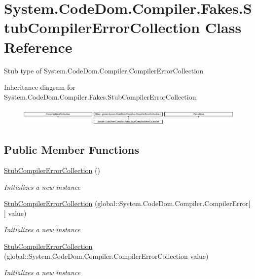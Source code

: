 \hypertarget{class_system_1_1_code_dom_1_1_compiler_1_1_fakes_1_1_stub_compiler_error_collection}{\section{System.\-Code\-Dom.\-Compiler.\-Fakes.\-Stub\-Compiler\-Error\-Collection Class Reference}
\label{class_system_1_1_code_dom_1_1_compiler_1_1_fakes_1_1_stub_compiler_error_collection}
}


Stub type of System.\-Code\-Dom.\-Compiler.\-Compiler\-Error\-Collection 


Inheritance diagram for System.\-Code\-Dom.\-Compiler.\-Fakes.\-Stub\-Compiler\-Error\-Collection\-:\begin{figure}[H]
\begin{center}
\leavevmode
\includegraphics[height=0.926385cm]{class_system_1_1_code_dom_1_1_compiler_1_1_fakes_1_1_stub_compiler_error_collection}
\end{center}
\end{figure}
\subsection*{Public Member Functions}
\begin{DoxyCompactItemize}
\item 
\hyperlink{class_system_1_1_code_dom_1_1_compiler_1_1_fakes_1_1_stub_compiler_error_collection_a178c07cb5113a5e9428c9afb38475001}{Stub\-Compiler\-Error\-Collection} ()
\begin{DoxyCompactList}\small\item\em Initializes a new instance\end{DoxyCompactList}\item 
\hyperlink{class_system_1_1_code_dom_1_1_compiler_1_1_fakes_1_1_stub_compiler_error_collection_a1107dc71b77c8faf5d42b5511cb58896}{Stub\-Compiler\-Error\-Collection} (global\-::\-System.\-Code\-Dom.\-Compiler.\-Compiler\-Error\mbox{[}$\,$\mbox{]} value)
\begin{DoxyCompactList}\small\item\em Initializes a new instance\end{DoxyCompactList}\item 
\hyperlink{class_system_1_1_code_dom_1_1_compiler_1_1_fakes_1_1_stub_compiler_error_collection_a89835dfd9519fcd71983336565fd615c}{Stub\-Compiler\-Error\-Collection} (global\-::\-System.\-Code\-Dom.\-Compiler.\-Compiler\-Error\-Collection value)
\begin{DoxyCompactList}\small\item\em Initializes a new instance\end{DoxyCompactList}\end{DoxyCompactItemize}
